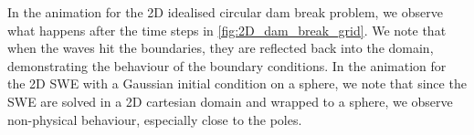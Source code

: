 In the animation for the 2D idealised circular dam break problem, we observe what happens after the time steps in \autoref{fig:2D_dam_break_grid}.
We note that when the waves hit the boundaries, they are reflected back into the domain, demonstrating the behaviour of the boundary conditions.
In the animation for the 2D SWE with a Gaussian initial condition on a sphere, we note that since the SWE are solved in a 2D cartesian domain and wrapped to a sphere, we observe non-physical behaviour, especially close to the poles.
